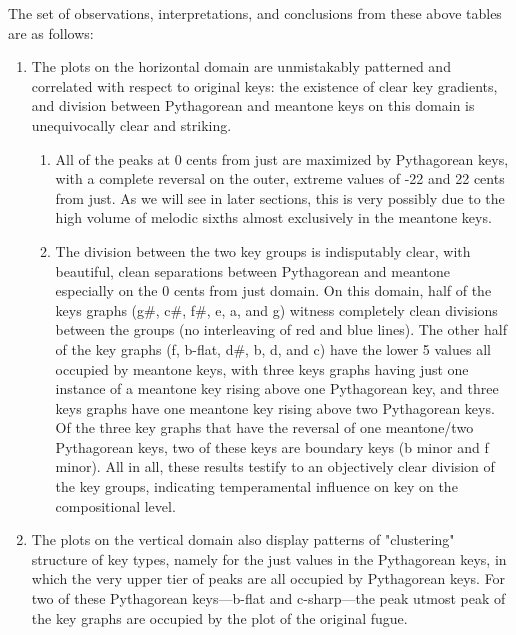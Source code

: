 The set of observations, interpretations, and conclusions from these
above tables are as follows:

\begin{enumerate}
\def\labelenumi{\arabic{enumi}.}
\tightlist
\item
  The plots on the horizontal domain are unmistakably patterned and
  correlated with respect to original keys: the existence of clear key
  gradients, and division between Pythagorean and meantone keys on this
  domain is unequivocally clear and striking.

  \begin{enumerate}
  \def\labelenumii{\arabic{enumii}.}
  \tightlist
  \item
    All of the peaks at 0 cents from just are maximized by Pythagorean
    keys, with a complete reversal on the outer, extreme values of -22
    and 22 cents from just. As we will see in later sections, this is
    very possibly due to the high volume of melodic sixths almost
    exclusively in the meantone keys.
  \item
    The division between the two key groups is indisputably clear, with
    beautiful, clean separations between Pythagorean and meantone
    especially on the 0 cents from just domain. On this domain, half of
    the keys graphs (g\#, c\#, f\#, e, a, and g) witness completely
    clean divisions between the groups (no interleaving of red and blue
    lines). The other half of the key graphs (f, b-flat, d\#, b, d, and
    c) have the lower 5 values all occupied by meantone keys, with three
    keys graphs having just one instance of a meantone key rising above
    one Pythagorean key, and three keys graphs have one meantone key
    rising above two Pythagorean keys. Of the three key graphs that have
    the reversal of one meantone/two Pythagorean keys, two of these keys
    are boundary keys (b minor and f minor). All in all, these results
    testify to an objectively clear division of the key groups,
    indicating temperamental influence on key on the compositional
    level.
  \end{enumerate}
\item
  The plots on the vertical domain also display patterns of "clustering"
  structure of key types, namely for the just values in the Pythagorean
  keys, in which the very upper tier of peaks are all occupied by
  Pythagorean keys. For two of these Pythagorean keys---b-flat and
  c-sharp---the peak utmost peak of the key graphs are occupied by
  the plot of the original fugue.
\end{enumerate}

